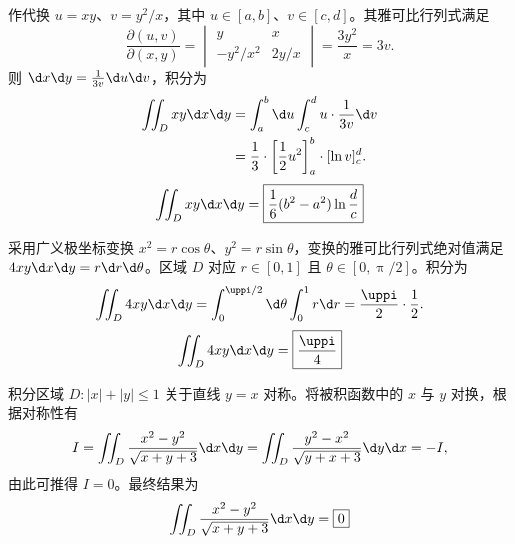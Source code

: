 \begin{solution}
    作代换 $u = xy$、$v = y^2/x$，其中 $u \in [a, b]$、$v \in [c, d]$。其雅可比行列式满足
    \begin{equation}
        \frac{\partial(u,v)}{\partial(x,y)} = \begin{vmatrix} y & x \\ -y^2/x^2 & 2y/x \end{vmatrix} = \frac{3y^2}{x} = 3v.
    \end{equation}
    则 $\d x \d y = \frac{1}{3v} \d u \d v$，积分为
    \begin{equation}
        \begin{aligned}
            \iint_D xy \d x \d y & = \int_a^b \d u \int_c^d u \cdot \frac{1}{3v} \d v                       \\
                                 & = \frac{1}{3} \cdot \left[ \frac{1}{2}u^2 \right]_a^b \cdot [\ln v]_c^d.
        \end{aligned}
    \end{equation}
    \begin{equation}
        \iint_D xy \d x \d y = \boxed{\frac{1}{6}(b^2-a^2) \ln \frac{d}{c}}
    \end{equation}


    采用广义极坐标变换 $x^2 = r \cos \theta$、$y^2 = r \sin \theta$，变换的雅可比行列式绝对值满足 $4xy \d x \d y = r \d r \d \theta$。区域 $D$ 对应 $r \in [0, 1]$ 且 $\theta \in [0, \uppi/2]$。积分为
    \begin{equation}
        \iint_D 4xy \d x \d y = \int_0^{\uppi/2} \d \theta \int_0^1 r \d r = \frac{\uppi}{2} \cdot \frac{1}{2}.
    \end{equation}
    \begin{equation}
        \iint_D 4xy \d x \d y = \boxed{\frac{\uppi}{4}}
    \end{equation}


    积分区域 $D: |x|+|y| \leqslant 1$ 关于直线 $y=x$ 对称。将被积函数中的 $x$ 与 $y$ 对换，根据对称性有
    \begin{equation}
        I = \iint_D \frac{x^2-y^2}{\sqrt{x+y+3}} \d x \d y = \iint_D \frac{y^2-x^2}{\sqrt{y+x+3}} \d y \d x = -I,
    \end{equation}
    由此可推得 $I = 0$。最终结果为
    \begin{equation}
        \iint_D \frac{x^2-y^2}{\sqrt{x+y+3}} \d x \d y = \boxed{0}
    \end{equation}


\end{solution}
